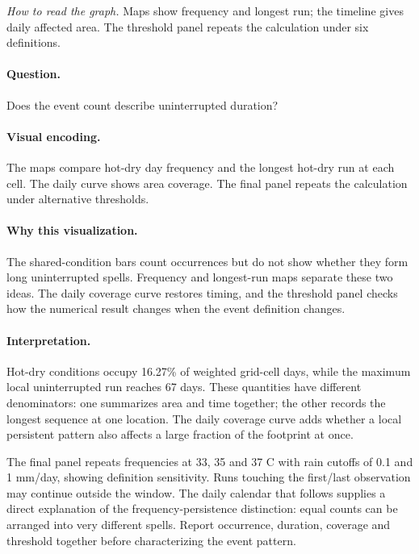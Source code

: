 \documentclass[conference,a4paper]{IEEEtran}
\begin{document}
\noindent\textit{How to read the graph.} Maps show frequency and longest run; the timeline gives daily affected area. The threshold panel repeats the calculation under six definitions.

\paragraph{Question.} Does the event count describe uninterrupted duration?



\paragraph{Visual encoding.} The maps compare hot-dry day frequency and the longest hot-dry run at each cell. The daily curve shows area coverage. The final panel repeats the calculation under alternative thresholds.



\paragraph{Why this visualization.} The shared-condition bars count occurrences but do not show whether they form long uninterrupted spells. Frequency and longest-run maps separate these two ideas. The daily coverage curve restores timing, and the threshold panel checks how the numerical result changes when the event definition changes.



\paragraph{Interpretation.} Hot-dry conditions occupy 16.27\% of weighted grid-cell days, while the maximum local uninterrupted run reaches 67 days. These quantities have different denominators: one summarizes area and time together; the other records the longest sequence at one location. The daily coverage curve adds whether a local persistent pattern also affects a large fraction of the footprint at once.

The final panel repeats frequencies at 33, 35 and 37 C with rain cutoffs of 0.1 and 1 mm/day, showing definition sensitivity. Runs touching the first/last observation may continue outside the window. The daily calendar that follows supplies a direct explanation of the frequency-persistence distinction: equal counts can be arranged into very different spells. Report occurrence, duration, coverage and threshold together before characterizing the event pattern.
\end{document}
